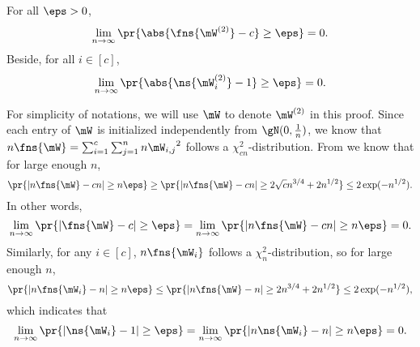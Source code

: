 \begin{lemma}
\label{lemma:W-norm}
For all $\eps>0$, 
\begin{equation}
    \lim_{n\to\infty}\pr{\abs{\fns{\mW^{(2)}}-c}\geq\eps}=0.
\end{equation}
Beside, for all $i\in[c]$,
\begin{equation}
    \lim_{n\to\infty}\pr{\abs{\ns{\mW_i^{(2)}}-1}\geq\eps}=0.
\end{equation}
\end{lemma}
\begin{proofof}{}
For simplicity of notations, we will use $\mW$ to denote $\mW^{(2)}$ in this proof.
Since each entry of $\mW$ is initialized independently from $\gN(0,\frac1n)$, we know that $n\fns{\mW}=\sum_{i=1}^c\sum_{j=1}^nn{\mW_{i,j}}^2$ follows a $\chi_{cn}^2$-distribution. From  we know that for large enough $n$,
\begin{equation}
\pr{|n\fns{\mW}-cn|\geq n\eps}\geq\pr{|n\fns{\mW}-cn|\geq 2\sqrt{c}n^{3/4}+2n^{1/2}}\leq 2\exp(-n^{1/2}).
\end{equation}
In other words,
\begin{equation}
\lim_{n\to\infty}\pr{|\fns{\mW}-c|\geq\eps} = \lim_{n\to\infty}\pr{|n\fns{\mW}-cn|\geq n\eps} = 0.
\end{equation}
Similarly, for any $i\in[c]$, $n\fns{\mW_i}$ follows a $\chi_n^2$-distribution, so for large enough $n$,
\begin{equation}
\pr{|n\fns{\mW_i}-n|\geq n\eps}\leq\pr{|n\fns{\mW}-n|\geq 2n^{3/4}+2n^{1/2}}\leq 2\exp(-n^{1/2}),
\end{equation}
which indicates that
\begin{equation}
\lim_{n\to\infty}\pr{|\ns{\mW_i}-1|\geq\eps} = \lim_{n\to\infty}\pr{|n\ns{\mW_i}-n|\geq n\eps} = 0.
\end{equation}
\end{proofof}

